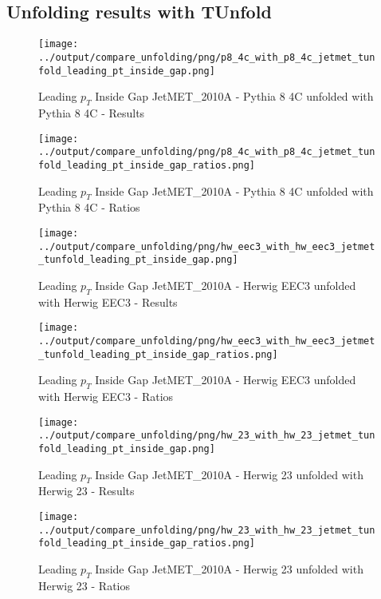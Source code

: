 \documentclass[11pt]{book}
\begin{document}
\clearpage
\subsection{Unfolding results with TUnfold}

\begin{figure}[ht]
\centering
\texttt{[image: ../output/compare\_unfolding/png/p8\_4c\_with\_p8\_4c\_jetmet\_tunfold\_leading\_pt\_inside\_gap.png]}
\caption{Leading $p_{T}$ Inside Gap JetMET\_2010A - Pythia 8 4C unfolded with Pythia 8 4C - Results}
\label{p8_p8_jetmet_tunfold_leading_pt_inside_gap_a}
\end{figure}

\begin{figure}[ht]
\centering
\texttt{[image: ../output/compare\_unfolding/png/p8\_4c\_with\_p8\_4c\_jetmet\_tunfold\_leading\_pt\_inside\_gap\_ratios.png]}
\caption{Leading $p_{T}$ Inside Gap JetMET\_2010A - Pythia 8 4C unfolded with Pythia 8 4C - Ratios}
\label{p8_p8_jetmet_tunfold_leading_pt_inside_gap_b}
\end{figure}

\begin{figure}[ht]
\centering
\texttt{[image: ../output/compare\_unfolding/png/hw\_eec3\_with\_hw\_eec3\_jetmet\_tunfold\_leading\_pt\_inside\_gap.png]}
\caption{Leading $p_{T}$ Inside Gap JetMET\_2010A - Herwig EEC3 unfolded with Herwig EEC3 - Results}
\label{hw_eec3_hw_eec3_jetmet_tunfold_leading_pt_inside_gap_a}
\end{figure}

\begin{figure}[ht]
\centering
\texttt{[image: ../output/compare\_unfolding/png/hw\_eec3\_with\_hw\_eec3\_jetmet\_tunfold\_leading\_pt\_inside\_gap\_ratios.png]}
\caption{Leading $p_{T}$ Inside Gap JetMET\_2010A - Herwig EEC3 unfolded with Herwig EEC3 - Ratios}
\label{hw_eec3_hw_eec3_jetmet_tunfold_leading_pt_inside_gap_b}
\end{figure}

\begin{figure}[ht]
\centering
\texttt{[image: ../output/compare\_unfolding/png/hw\_23\_with\_hw\_23\_jetmet\_tunfold\_leading\_pt\_inside\_gap.png]}
\caption{Leading $p_{T}$ Inside Gap JetMET\_2010A - Herwig 23 unfolded with Herwig 23 - Results}
\label{hw_23_hw_23_jetmet_tunfold_leading_pt_inside_gap_a}
\end{figure}

\begin{figure}[ht]
\centering
\texttt{[image: ../output/compare\_unfolding/png/hw\_23\_with\_hw\_23\_jetmet\_tunfold\_leading\_pt\_inside\_gap\_ratios.png]}
\caption{Leading $p_{T}$ Inside Gap JetMET\_2010A - Herwig 23 unfolded with Herwig 23 - Ratios}
\label{hw_23_hw_23_jetmet_tunfold_leading_pt_inside_gap_b}
\end{figure}
\end{document}
